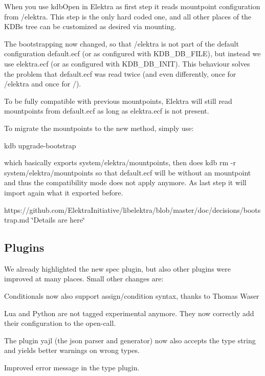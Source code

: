 When you use {\ttfamily kdb\+Open} in Elektra as first step it reads mountpoint configuration from {\ttfamily /elektra}. This step is the only hard coded one, and all other places of the K\+DB\textquotesingle{}s tree can be customized as desired via mounting.

The bootstrapping now changed, so that {\ttfamily /elektra} is not part of the default configuration {\ttfamily default.\+ecf} (or as configured with {\ttfamily K\+D\+B\+\_\+\+D\+B\+\_\+\+F\+I\+LE}), but instead we use {\ttfamily elektra.\+ecf} (or as configured with {\ttfamily K\+D\+B\+\_\+\+D\+B\+\_\+\+I\+N\+IT}). This behaviour solves the problem that {\ttfamily default.\+ecf} was read twice (and even differently, once for {\ttfamily /elektra} and once for {\ttfamily /}).

To be fully compatible with previous mountpoints, Elektra will still read mountpoints from {\ttfamily default.\+ecf} as long as {\ttfamily elektra.\+ecf} is not present.

To migrate the mountpoints to the new method, simply use\+: \begin{DoxyVerb}    kdb upgrade-bootstrap
\end{DoxyVerb}


which basically exports {\ttfamily system/elektra/mountpoints}, then does {\ttfamily kdb rm -\/r system/elektra/mountpoints} so that {\ttfamily default.\+ecf} will be without an mountpoint and thus the compatibility mode does not apply anymore. As last step it will import again what it exported before.

https\+://github.com/\+Elektra\+Initiative/libelektra/blob/master/doc/decisions/bootstrap.\+md \char`\"{}\+Details are here\char`\"{}

\subsection*{Plugins}

We already highlighted the new {\ttfamily spec} plugin, but also other plugins were improved at many places. Small other changes are\+:


\begin{DoxyItemize}
\item Conditionals now also support {\ttfamily assign/condition} syntax, thanks to Thomas Waser
\item Lua and Python are not tagged experimental anymore. They now correctly add their configuration to the open-\/call.
\item The plugin {\ttfamily yajl} (the json parser and generator) now also accepts the type {\ttfamily string} and yields better warnings on wrong types.
\item Improved error message in the {\ttfamily type} plugin.
\end{DoxyItemize}

